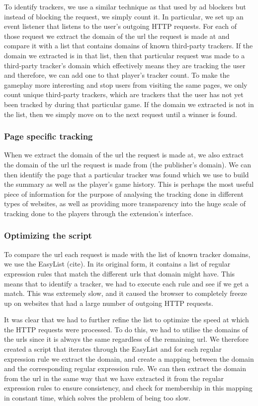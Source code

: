 \documentclass{l4proj}
\begin{document}
To identify trackers, we use a similar technique as that used by ad blockers but instead of blocking the request, we simply count it. In particular, we set up an event listener that listens to the user's outgoing HTTP requests. For each of those request we extract the domain of the url the request is made at and compare it with a list that contains domains of known third-party trackers. If the domain we extracted is in that list, then that particular request was made to a third-party tracker's domain which effectively means they are tracking the user and therefore, we can add one to that player's tracker count. To make the gameplay more interesting and stop users from visiting the same pages, we only count unique third-party trackers, which are trackers that the user has not yet been tracked by during that particular game. If the domain we extracted is not in the list, then we simply move on to the next request until a winner is found.

\subsubsection{Page specific tracking}
When we extract the domain of the url the request is made at, we also extract the domain of the url the request is made from (the publisher's domain). We can then identify the page that a particular tracker was found which we use to build the summary as well as the player's game history. This is perhaps the most useful piece of information for the purpose of analysing the tracking done in different types of websites, as well as providing more transparency into the huge scale of tracking done to the players through the extension's interface.

\subsubsection{Optimizing the script}
To compare the url each request is made with the list of known tracker domains, we use the EasyList (cite). In its original form, it contains a list of regular expression rules that match the different urls that domain might have. This means that to identify a tracker, we had to execute each rule and see if we get a match. This was extremely slow, and it caused the browser to completely freeze up on websites that had a large number of outgoing HTTP requests.

It was clear that we had to further refine the list to optimize the speed at which the HTTP requests were processed. To do this, we had to utilise the domains of the urls since it is always the same regardless of the remaining url. We therefore created a script that iterates through the EasyList and for each regular expression rule we extract the domain, and create a mapping between the domain and the corresponding regular expression rule. We can then extract the domain from the url in the same way that we have extracted it from the regular expression rules to ensure consistency, and check for membership in this mapping in constant time, which solves the problem of being too slow.
\end{document}
